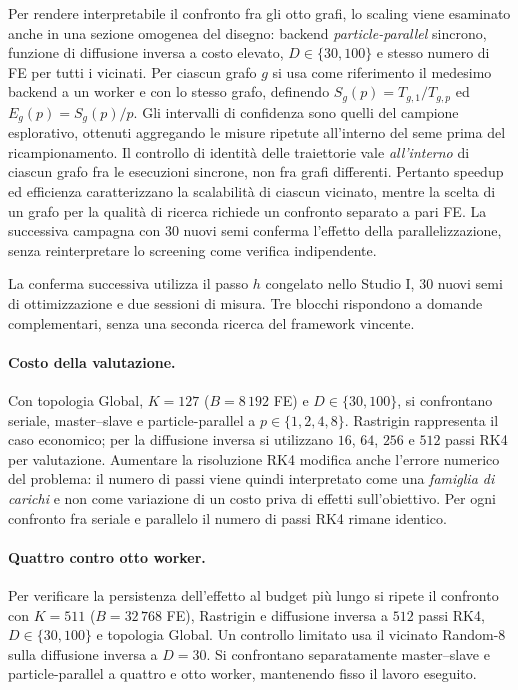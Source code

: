 Per rendere interpretabile il confronto fra gli otto grafi, lo scaling viene esaminato anche in una sezione omogenea del disegno: backend \emph{particle-parallel} sincrono, funzione di diffusione inversa a costo elevato, $D\in\{30,100\}$ e stesso numero di FE per tutti i vicinati. Per ciascun grafo $g$ si usa come riferimento il medesimo backend a un worker e con lo stesso grafo, definendo $S_g(p)=T_{g,1}/T_{g,p}$ ed $E_g(p)=S_g(p)/p$. Gli intervalli di confidenza sono quelli del campione esplorativo, ottenuti aggregando le misure ripetute all'interno del seme prima del ricampionamento. Il controllo di identità delle traiettorie vale \emph{all'interno} di ciascun grafo fra le esecuzioni sincrone, non fra grafi differenti. Pertanto speedup ed efficienza caratterizzano la scalabilità di ciascun vicinato, mentre la scelta di un grafo per la qualità di ricerca richiede un confronto separato a pari FE. La successiva campagna con 30 nuovi semi conferma l'effetto della parallelizzazione, senza reinterpretare lo screening come verifica indipendente.

La conferma successiva utilizza il passo $h$ congelato nello Studio I, 30 nuovi semi di ottimizzazione e due sessioni di misura. Tre blocchi rispondono a domande complementari, senza una seconda ricerca del framework vincente.

\paragraph{Costo della valutazione.}
Con topologia Global, $K=127$ ($B=8\,192$ FE) e $D\in\{30,100\}$, si confrontano seriale, master--slave e particle-parallel a $p\in\{1,2,4,8\}$. Rastrigin rappresenta il caso economico; per la diffusione inversa si utilizzano $16$, $64$, $256$ e $512$ passi RK4 per valutazione. Aumentare la risoluzione RK4 modifica anche l'errore numerico del problema: il numero di passi viene quindi interpretato come una \emph{famiglia di carichi} e non come variazione di un costo priva di effetti sull'obiettivo. Per ogni confronto fra seriale e parallelo il numero di passi RK4 rimane identico.

\paragraph{Quattro contro otto worker.}
Per verificare la persistenza dell'effetto al budget più lungo si ripete il confronto con $K=511$ ($B=32\,768$ FE), Rastrigin e diffusione inversa a $512$ passi RK4, $D\in\{30,100\}$ e topologia Global. Un controllo limitato usa il vicinato Random-8 sulla diffusione inversa a $D=30$. Si confrontano separatamente master--slave e particle-parallel a quattro e otto worker, mantenendo fisso il lavoro eseguito.

